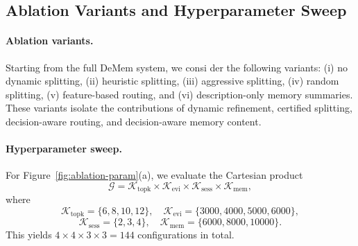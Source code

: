 \documentclass{article}
\theoremstyle{plain}
\theoremstyle{definition}
\theoremstyle{remark}
\begin{document}
\subsection{Ablation Variants and Hyperparameter Sweep}
\label{app:ablation-details}

\paragraph{Ablation variants.}
Starting from the full DeMem system, we consi  der the following variants: 
(i) no dynamic splitting, 
(ii) heuristic splitting, 
(iii) aggressive splitting, 
(iv) random splitting, 
(v) feature-based routing, and 
(vi) description-only memory summaries. 
These variants isolate the contributions of dynamic refinement, certified splitting, decision-aware routing, and decision-aware memory content.

\paragraph{Hyperparameter sweep.}
For Figure~\ref{fig:ablation-param}(a), we evaluate the Cartesian product
\[
\mathcal{G}
=
\mathcal{K}_{\mathrm{topk}}
\times
\mathcal{K}_{\mathrm{evi}}
\times
\mathcal{K}_{\mathrm{sess}}
\times
\mathcal{K}_{\mathrm{mem}},
\]
where
\[
\mathcal{K}_{\mathrm{topk}}=\{6,8,10,12\},\quad
\mathcal{K}_{\mathrm{evi}}=\{3000,4000,5000,6000\},
\]
\[
\mathcal{K}_{\mathrm{sess}}=\{2,3,4\},\quad
\mathcal{K}_{\mathrm{mem}}=\{6000,8000,10000\}.
\]
This yields \(4\times 4\times 3\times 3=144\) configurations in total.
\end{document}
